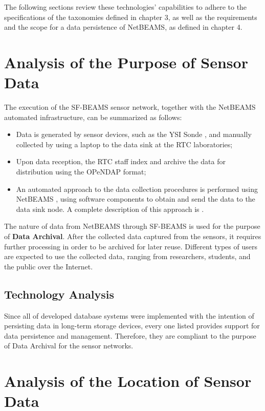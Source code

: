 The following sections review these technologies' capabilities to adhere to
the specifications of the taxonomies defined in chapter 3, as well as the
requirements and the scope for a data persistence of NetBEAMS, as defined in
chapter 4.

\section{Analysis of the Purpose of Sensor Data}

The execution of the SF-BEAMS sensor network, together with the NetBEAMS
automated infrastructure, can be summarized as follows:

\begin{itemize}
  \item Data is generated by sensor devices, such as the YSI Sonde
  \cite{YSI-Sonde}, and manually collected by using a laptop to the data sink
  at the RTC laboratories;
  \item Upon data reception, the RTC staff index and archive the data for
  distribution using the OPeNDAP format;
  \item An automated approach to the data collection procedures is performed 
  using NetBEAMS \cite{netbeams2009}, using software components to obtain and
  send the data to the data sink node. A complete description of this approach
  is \cite{netbeams-dsp-architecture}.
\end{itemize}

The nature of data from NetBEAMS through SF-BEAMS is used for the purpose of
\textbf{Data Archival}. After the collected data captured from the sensors, it
requires further processing in order to be archived for later reuse. Different
types of users are expected to use the collected data, ranging from
researchers, students, and the public over the Internet.

\subsection{Technology Analysis}

Since all of developed database systems were implemented with the intention of
persisting data in long-term storage devices, every one listed provides
support for data persistence and management. Therefore, they are compliant to
the purpose of Data Archival for the sensor networks.

\section{Analysis of the Location of Sensor Data}
\label{sec:sn-data-location}

